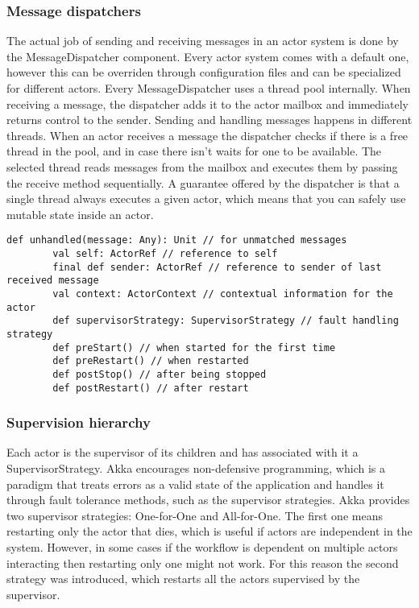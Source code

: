 \documentclass[12pt]{article}
\begin{document}
	\subsubsection{Message dispatchers}
	The actual job of sending and receiving messages in an actor system is done by the MessageDispatcher\cite{ScalaInAction} 
	component. Every actor system comes with a default one, however this can be overriden through configuration
	files and can be specialized for different actors. Every MessageDispatcher uses a thread pool internally.
	When receiving a message, the dispatcher adds it to the actor mailbox and immediately returns control 
	to the sender. Sending and handling messages happens in different threads. When an actor receives 
	a message the dispatcher checks if there is a free thread in the pool, and in case there isn't waits 
	for one to be available. The selected thread reads messages from the mailbox and executes them 
	by passing the receive method sequentially. A guarantee offered by the dispatcher is that a single 
	thread always executes a given actor, which means that you can safely use mutable state inside an 
	actor. 

	
	\begin{lstlisting}[style=myScalastyle, caption={Actor API}, label={actorAPI}]
		def unhandled(message: Any): Unit // for unmatched messages 
		val self: ActorRef // reference to self
		final def sender: ActorRef // reference to sender of last received message 
		val context: ActorContext // contextual information for the actor 
		def supervisorStrategy: SupervisorStrategy // fault handling strategy 
		def preStart() // when started for the first time 
		def preRestart() // when restarted 
		def postStop() // after being stopped 
		def postRestart() // after restart 
	\end{lstlisting}

	\subsubsection{Supervision hierarchy}
	Each actor is the supervisor of its children and has associated with it a 
	SupervisorStrategy\cite{AkkaDocs}. Akka encourages non-defensive programming, 
	which is a paradigm that treats errors as a valid state of the application 
	and handles it through fault tolerance methods, such as the supervisor strategies. 
	Akka provides two supervisor strategies: One-for-One and All-for-One. The first 
	one means restarting only the actor that dies, which is useful if actors are independent 
	in the system. However, in some cases if the workflow is dependent on multiple actors 
	interacting then restarting only one might not work. For this reason the second strategy 
	was introduced, which restarts all the actors supervised by the supervisor. 
\end{document}
